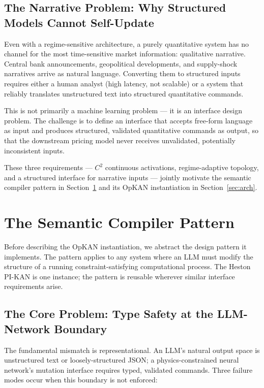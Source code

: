 \documentclass[11pt,a4paper]{article}
\begin{document}
\subsection{The Narrative Problem: Why Structured Models Cannot Self-Update}

Even with a regime-sensitive architecture, a purely quantitative system has no channel
for the most time-sensitive market information: qualitative narrative. Central bank
announcements, geopolitical developments, and supply-shock narratives arrive as natural
language. Converting them to structured inputs requires either a human analyst (high
latency, not scalable) or a system that reliably translates unstructured text into
structured quantitative commands.

This is not primarily a machine learning problem --- it is an interface design problem.
The challenge is to define an interface that accepts free-form language as input and
produces structured, validated quantitative commands as output, so that the downstream
pricing model never receives unvalidated, potentially inconsistent inputs.

These three requirements --- $C^2$ continuous activations, regime-adaptive topology, and a
structured interface for narrative inputs --- jointly motivate the semantic compiler
pattern in Section~\ref{sec:pattern} and its OpKAN instantiation in Section~\ref{sec:arch}.

\section{The Semantic Compiler Pattern}
\label{sec:pattern}

Before describing the OpKAN instantiation, we abstract the design pattern it
implements. The pattern applies to any system where an LLM must modify the structure
of a running constraint-satisfying computational process. The Heston PI-KAN is one
instance; the pattern is reusable wherever similar interface requirements arise.

\subsection{The Core Problem: Type Safety at the LLM-Network Boundary}

The fundamental mismatch is representational. An LLM's natural output space is
unstructured text or loosely-structured JSON; a physics-constrained neural network's
mutation interface requires typed, validated commands. Three failure modes occur when
this boundary is not enforced:
\end{document}
